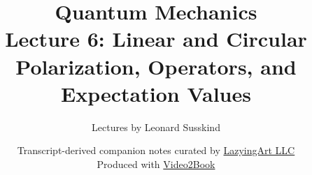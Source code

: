 \documentclass[11pt,oneside]{book}
\begin{document}
\hypersetup{pageanchor=false}
\frontmatter
\title{Quantum Mechanics\\[0.45em]
\large Lecture 6: Linear and Circular Polarization, Operators, and Expectation Values}
\author{Lectures by Leonard Susskind}
\date{Transcript-derived companion notes curated by
\href{https://lazying.art}{LazyingArt LLC}\\[0.35em]
\small Produced with
\href{https://github.com/lachlanchen/Video2Book}{Video2Book}}
\maketitle
\hypersetup{pageanchor=true}
\mainmatter

\end{document}
